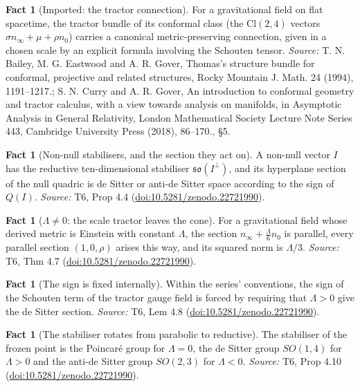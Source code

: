 \documentclass[11pt]{article}
\theoremstyle{definition}
\newtheorem{fact}[theorem]{Fact}
\theoremstyle{plain}
\providecommand{\Cl}{}\renewcommand{\Cl}{\mathrm{Cl}}
\providecommand{\nInf}{}\renewcommand{\nInf}{n_\infty}
\providecommand{\nO}{}\renewcommand{\nO}{n_0}
\begin{document}
\begin{fact}[Imported: the tractor connection]\label{c:interior.imported-tractor-connection}
For a gravitational field on flat spacetime, the tractor bundle of its conformal class (the $\Cl(2,4)$ vectors $\sigma\nInf + \mu + \rho\nO$) carries a canonical metric-preserving connection, given in a chosen scale by an explicit formula involving the Schouten tensor.
\emph{Source:} T. N. Bailey, M. G. Eastwood and A. R. Gover, Thomas's structure bundle for conformal, projective and related structures, Rocky Mountain J. Math. 24 (1994), 1191--1217.; S. N. Curry and A. R. Gover, An introduction to conformal geometry and tractor calculus, with a view towards analysis on manifolds, in Asymptotic Analysis in General Relativity, London Mathematical Society Lecture Note Series 443, Cambridge University Press (2018), 86--170., \S 5.
\end{fact}

\begin{fact}[Non-null stabilisers, and the section they act on]\label{c:interior.non-null-stabilisers-section-they-act}
A non-null vector $I$ has the reductive ten-dimensional stabiliser $\mathfrak{so}(I^\perp)$, and its hyperplane section of the null quadric is de Sitter or anti-de Sitter space according to the sign of $Q(I)$.
\emph{Source:} T6, Prop 4.4 (\href{https://doi.org/10.5281/zenodo.22721990}{doi:10.5281/zenodo.22721990}).
\end{fact}

\begin{fact}[$\Lambda \neq 0$: the scale tractor leaves the cone]\label{c:interior.scale-tractor-leaves-cone}
For a gravitational field whose derived metric is Einstein with constant $\Lambda$, the section $\nInf + \tfrac{\Lambda}{6}\nO$ is parallel, every parallel section $(1, 0, \rho)$ arises this way, and its squared norm is $\Lambda/3$.
\emph{Source:} T6, Thm 4.7 (\href{https://doi.org/10.5281/zenodo.22721990}{doi:10.5281/zenodo.22721990}).
\end{fact}

\begin{fact}[The sign is fixed internally]\label{c:interior.sign-fixed-internally}
Within the series' conventions, the sign of the Schouten term of the tractor gauge field is forced by requiring that $\Lambda > 0$ give the de Sitter section.
\emph{Source:} T6, Lem 4.8 (\href{https://doi.org/10.5281/zenodo.22721990}{doi:10.5281/zenodo.22721990}).
\end{fact}

\begin{fact}[The stabiliser rotates from parabolic to reductive]\label{c:interior.stabiliser-rotates-parabolic-reductive}
The stabiliser of the frozen point is the Poincar\'e group for $\Lambda = 0$, the de Sitter group $SO(1,4)$ for $\Lambda > 0$ and the anti-de Sitter group $SO(2,3)$ for $\Lambda < 0$.
\emph{Source:} T6, Prop 4.10 (\href{https://doi.org/10.5281/zenodo.22721990}{doi:10.5281/zenodo.22721990}).
\end{fact}
\end{document}
